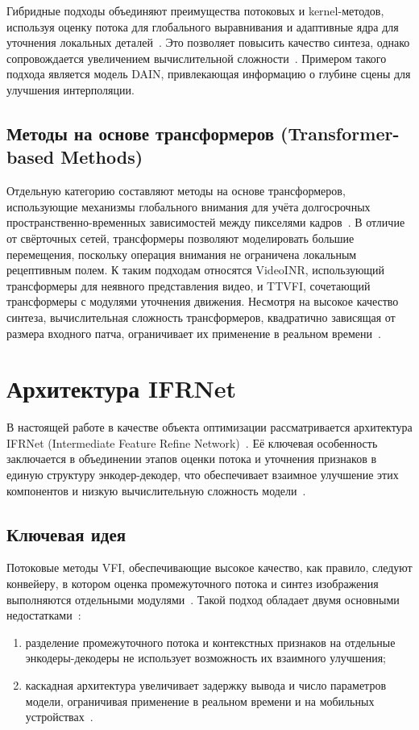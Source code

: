 Гибридные подходы объединяют преимущества потоковых и kernel-методов, используя оценку потока для глобального выравнивания и адаптивные ядра для уточнения локальных деталей~\cite{kye2026acevfi}. Это позволяет повысить качество синтеза, однако сопровождается увеличением вычислительной сложности~\cite{huang2022}. Примером такого подхода является модель DAIN, привлекающая информацию о глубине сцены для улучшения интерполяции.

\subsection*{Методы на основе трансформеров (Transformer-based Methods)}

Отдельную категорию составляют методы на основе трансформеров, использующие механизмы глобального внимания для учёта долгосрочных пространственно-временных зависимостей между пикселями кадров~\cite{kye2026acevfi}. В отличие от свёрточных сетей, трансформеры позволяют моделировать большие перемещения, поскольку операция внимания не ограничена локальным рецептивным полем. К таким подходам относятся VideoINR, использующий трансформеры для неявного представления видео, и TTVFI, сочетающий трансформеры с модулями уточнения движения. Несмотря на высокое качество синтеза, вычислительная сложность трансформеров, квадратично зависящая от размера входного патча, ограничивает их применение в реальном времени~\cite{kye2026acevfi}.

\section{Архитектура IFRNet}

В настоящей работе в качестве объекта оптимизации рассматривается архитектура IFRNet (Intermediate Feature Refine Network)~\cite{IFRNet2022}. Её ключевая особенность заключается в объединении этапов оценки потока и уточнения признаков в единую структуру энкодер-декодер, что обеспечивает взаимное улучшение этих компонентов и низкую вычислительную сложность модели~\cite{IFRNet2022}.

\subsection*{Ключевая идея}

Потоковые методы VFI, обеспечивающие высокое качество, как правило, следуют конвейеру, в котором оценка промежуточного потока и синтез изображения выполняются отдельными модулями~\cite{IFRNet2022}. Такой подход обладает двумя основными недостатками~\cite{IFRNet2022}:
\begin{enumerate}
	\item разделение промежуточного потока и контекстных признаков на отдельные энкодеры-декодеры не использует возможность их взаимного улучшения;
	\item каскадная архитектура увеличивает задержку вывода и число параметров модели, ограничивая применение в реальном времени и на мобильных устройствах~\cite{IFRNet2022}.
\end{enumerate}

